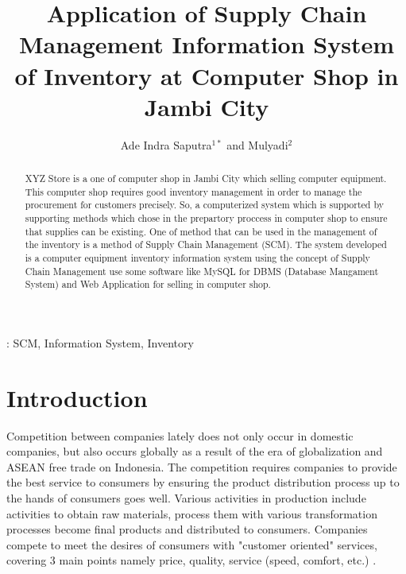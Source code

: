 \documentclass[12pt,a4paper,final]{iopart}
\begin{document}
\title[Preparing an article for INCITEST 2020]{Application of Supply Chain Management Information System of Inventory at Computer Shop in Jambi City}

\author{Ade Indra Saputra$^{1*}$ and Mulyadi$^{2}$}
\address{$^1$Master of Information Systems, Universitas Komputer Indonesia, Indonesia}
\address{$^2$Department of Information System, Universitas Dinamika Bangsa Jambi, Indonesia}




\begin{abstract}
XYZ Store is a one of computer shop in Jambi City which selling computer equipment. This computer shop requires good inventory management in order to manage the procurement for customers precisely. So, a computerized system which is supported by supporting methods which chose in the prepartory proccess in computer shop to ensure that supplies can be existing. One of method that can be used in the management of the inventory is a method of Supply Chain Management (SCM). The system developed is a computer equipment inventory information system using the concept of Supply Chain Management use some software like MySQL for DBMS (Database Mangament System) and Web Application for selling in computer shop.

\end{abstract}

\vspace{2pc}
: SCM, Information System, Inventory

\section{Introduction}

Competition between companies lately does not only occur in domestic companies, but also occurs globally as a result of the era of globalization and ASEAN free trade on Indonesia. The competition requires companies to provide the best service to consumers by ensuring the product distribution process up to the hands of consumers goes well. Various activities in production include activities to obtain raw materials, process them with various transformation processes become final products and distributed to consumers. Companies compete to meet the desires of consumers with "customer oriented" services, covering 3 main points namely price, quality, service (speed, comfort, etc.) \cite{Indrajit2016a}.
\end{document}
